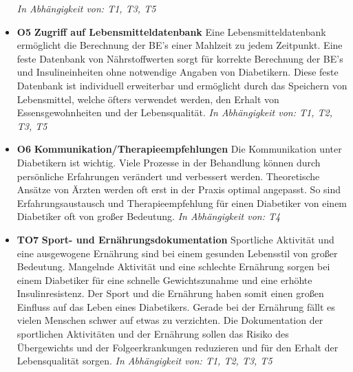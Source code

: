 \documentclass[a4paper,11pt]{article}%
\renewcommand{\\}{\vspace*{0.5\baselineskip} \newline}
\begin{document}
\begin{itemize}
	\emph{In Abhängigkeit von: T1, T3, T5} \\
	\item \lbrack \textbf{O5}\rbrack  \textbf{ Zugriff auf Lebensmitteldatenbank} \\
	Eine Lebensmitteldatenbank ermöglicht die Berechnung der BE’s einer Mahlzeit zu jedem Zeitpunkt. Eine feste Datenbank von Nährstoffwerten sorgt für korrekte Berechnung der BE’s und Insulineinheiten ohne notwendige Angaben von Diabetikern. Diese feste Datenbank ist individuell erweiterbar und ermöglicht durch das Speichern von Lebensmittel, welche öfters verwendet werden, den Erhalt von Essensgewohnheiten und der Lebensqualität.\newline
	\emph{In Abhängigkeit von: T1, T2, T3, T5} \\
	\item \lbrack \textbf{O6}\rbrack  \textbf{ Kommunikation/Therapieempfehlungen} \\
	Die Kommunikation unter Diabetikern ist wichtig. Viele Prozesse in der Behandlung können durch persönliche Erfahrungen verändert und verbessert werden. Theoretische Ansätze von Ärzten werden oft erst in der Praxis optimal angepasst. So sind Erfahrungsaustausch und Therapieempfehlung für einen Diabetiker von einem Diabetiker oft von großer Bedeutung. \newline
	\emph{In Abhängigkeit von: T4} \\
	\item \lbrack \textbf{TO7}\rbrack  \textbf{ Sport- und Ernährungsdokumentation} \\
	Sportliche Aktivität und eine ausgewogene Ernährung sind bei einem gesunden Lebensstil von großer Bedeutung. Mangelnde Aktivität und eine schlechte Ernährung sorgen bei einem Diabetiker für eine schnelle Gewichtszunahme und eine erhöhte Insulinresistenz. Der Sport und die Ernährung haben somit einen großen Einfluss auf das Leben eines Diabetikers. Gerade bei der Ernährung fällt es vielen Menschen schwer auf etwas zu verzichten. Die Dokumentation der sportlichen Aktivitäten und der Ernährung sollen das Risiko des Übergewichts und der Folgeerkrankungen reduzieren und für den Erhalt der Lebensqualität sorgen.\newline
	\emph{In Abhängigkeit von: T1, T2, T3, T5} \\
\end{itemize}

\newpage
\end{document}
